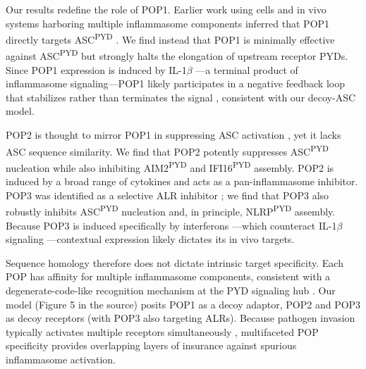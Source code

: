 \documentclass[11pt]{article}
\begin{document}
Our results redefine the role of POP1. Earlier work using cells and in vivo systems harboring multiple inflammasome components inferred that POP1 directly targets ASC\textsuperscript{PYD} \citep{dealmeida2015}. We find instead that POP1 is minimally effective against ASC\textsuperscript{PYD} but strongly halts the elongation of upstream receptor PYDs. Since POP1 expression is induced by IL-1$\beta$ \citep{dealmeida2015}---a terminal product of inflammasome signaling---POP1 likely participates in a negative feedback loop that stabilizes rather than terminates the signal \citep{brandman2008}, consistent with our decoy-ASC model.

POP2 is thought to mirror POP1 in suppressing ASC activation \citep{periasamy2017,ratsimandresy2017}, yet it lacks ASC sequence similarity. We find that POP2 potently suppresses ASC\textsuperscript{PYD} nucleation while also inhibiting AIM2\textsuperscript{PYD} and IFI16\textsuperscript{PYD} assembly. POP2 is induced by a broad range of cytokines \citep{ratsimandresy2017} and acts as a pan-inflammasome inhibitor. POP3 was identified as a selective ALR inhibitor \citep{khare2014}; we find that POP3 also robustly inhibits ASC\textsuperscript{PYD} nucleation and, in principle, NLRP\textsuperscript{PYD} assembly. Because POP3 is induced specifically by interferons \citep{khare2014}---which counteract IL-1$\beta$ signaling \citep{mayer2017}---contextual expression likely dictates its in vivo targets.

Sequence homology therefore does not dictate intrinsic target specificity. Each POP has affinity for multiple inflammasome components, consistent with a degenerate-code-like recognition mechanism at the PYD signaling hub \citep{matyszewski2021}. Our model (Figure 5 in the source) posits POP1 as a decoy adaptor, POP2 and POP3 as decoy receptors (with POP3 also targeting ALRs). Because pathogen invasion typically activates multiple receptors simultaneously \citep{brozdixit2016,zheng2020}, multifaceted POP specificity provides overlapping layers of insurance against spurious inflammasome activation.
\end{document}

